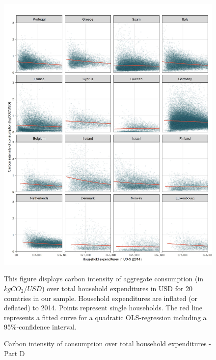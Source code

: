 \documentclass[12pt, a4paper]{article}
\newenvironment{subcaption}
{\strut
\vspace{-5pt}
\begin{minipage}[b]{0.9\textwidth}
  \hspace*{-\parindent}
  \footnotesize}
 {\end{minipage}}
\begin{document}
\begin{figure}[ht!]
  \centering
  \caption{Carbon intensity of consumption over total household expenditures - Part D} \label{fig:C4}
  \includegraphics{Analysis_Carbon_Intensity_Curve/All_Panel_D}
  \begin{subcaption}
    This figure displays carbon intensity of aggregate consumption (in $kgCO_{2}/USD$) over total household expenditures in USD for 20 countries in our sample. Household expenditures are inflated (or deflated) to 2014. Points represent single households. The red line represents a fitted curve for a quadratic OLS-regression including a 95\%-confidence interval.
  \end{subcaption}

\end{figure}

\clearpage

\end{document}
